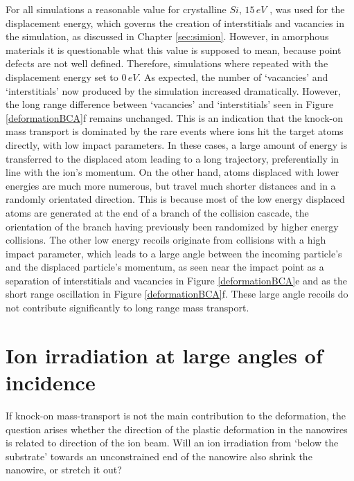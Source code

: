 \begin{Figure}[h]
For all simulations a reasonable value for crystalline $Si$, $15\,eV$ \cite{corbett_production_1965}, was used for the displacement energy, which governs the creation of interstitials and vacancies in the simulation, as discussed in Chapter \ref{sec:simion}. However, in amorphous materials it is questionable what this value is supposed to mean, because point defects are not well defined. Therefore, simulations where repeated with the displacement energy set to $0\,eV$. As expected, the number of `vacancies' and `interstitials' now produced by the simulation increased dramatically. However, the long range difference between `vacancies' and `interstitials' seen in Figure \ref{deformationBCA}f remains unchanged. This is an indication that the knock-on mass transport is dominated by the rare events where ions hit the target atoms directly, with low impact parameters. In these cases, a large amount of energy is transferred to the displaced atom leading to a long trajectory, preferentially in line with the ion's momentum. On the other hand, atoms displaced with lower energies are much more numerous, but travel much shorter distances and in a randomly orientated direction. This is because most of the low energy displaced atoms are generated at the end of a branch of the collision cascade, the orientation of the branch having previously been randomized by higher energy collisions. The other low energy recoils originate from collisions with a high impact parameter, which leads to a large angle between the incoming particle's and the displaced particle's momentum, as seen near the impact point as a separation of interstitials and vacancies in Figure \ref{deformationBCA}e and as the short range oscillation in Figure \ref{deformationBCA}f. These large angle recoils do not contribute significantly to long range mass transport.

\clearpage
\section{Ion irradiation at large angles of incidence}

If knock-on mass-transport is not the main contribution to the deformation, the question arises whether the direction of the plastic deformation in the nanowires is related to direction of the ion beam. Will an ion irradiation from `below the substrate' towards an unconstrained end of the nanowire also shrink the nanowire, or stretch it out? 


\end{Figure}
